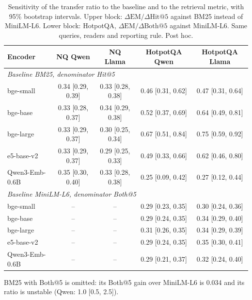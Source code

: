 \begin{table}[t]
\centering
\small
\caption{Sensitivity of the transfer ratio to the baseline and to the retrieval metric, with 95\% bootstrap intervals. Upper block: $\Delta\mathrm{EM}/\Delta\mathrm{Hit@5}$ against BM25 instead of MiniLM-L6. Lower block: HotpotQA, $\Delta\mathrm{EM}/\Delta\mathrm{Both@5}$ against MiniLM-L6. Same queries, readers and reporting rule. Post hoc.}
\label{tab:altbase}
\begin{tabular}{lcccc}
\toprule
Encoder & NQ Qwen & NQ Llama & HotpotQA Qwen & HotpotQA Llama \\
\midrule
\multicolumn{5}{l}{\emph{Baseline BM25, denominator Hit@5}} \\
bge-small & 0.34 [0.29, 0.39] & 0.33 [0.28, 0.38] & 0.46 [0.31, 0.62] & 0.47 [0.31, 0.64] \\
bge-base & 0.33 [0.28, 0.37] & 0.34 [0.29, 0.38] & 0.52 [0.37, 0.69] & 0.64 [0.49, 0.81] \\
bge-large & 0.33 [0.29, 0.37] & 0.30 [0.25, 0.34] & 0.67 [0.51, 0.84] & 0.75 [0.59, 0.92] \\
e5-base-v2 & 0.33 [0.29, 0.37] & 0.29 [0.25, 0.33] & 0.49 [0.33, 0.66] & 0.62 [0.46, 0.80] \\
Qwen3-Emb-0.6B & 0.35 [0.30, 0.40] & 0.33 [0.28, 0.38] & 0.25 [0.09, 0.42] & 0.27 [0.12, 0.44] \\
\midrule
\multicolumn{5}{l}{\emph{Baseline MiniLM-L6, denominator Both@5}} \\
bge-small & -- & -- & 0.29 [0.23, 0.35] & 0.30 [0.24, 0.36] \\
bge-base & -- & -- & 0.29 [0.24, 0.35] & 0.34 [0.29, 0.40] \\
bge-large & -- & -- & 0.31 [0.26, 0.35] & 0.34 [0.29, 0.39] \\
e5-base-v2 & -- & -- & 0.29 [0.24, 0.35] & 0.35 [0.30, 0.41] \\
Qwen3-Emb-0.6B & -- & -- & 0.29 [0.21, 0.37] & 0.32 [0.24, 0.40] \\
\bottomrule
\end{tabular}
\par\smallskip\parbox{\linewidth}{\footnotesize BM25 with Both@5 is omitted: its Both@5 gain over MiniLM-L6 is 0.034 and its ratio is unstable (Qwen: 1.0 [0.5, 2.5]).}
\end{table}
